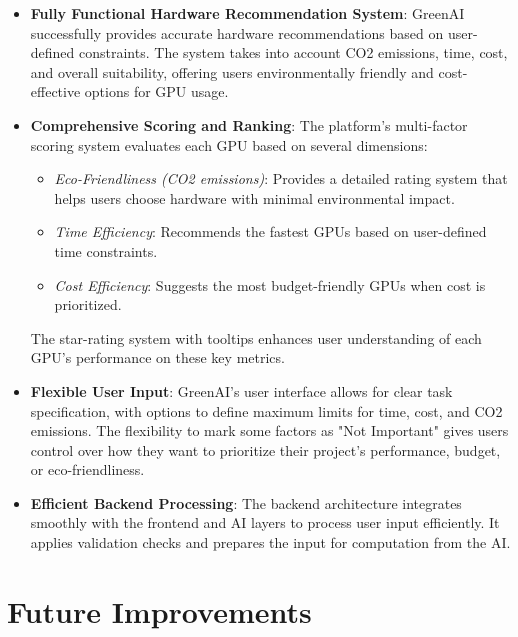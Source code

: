 \documentclass{report}
\begin{document}
\begin{itemize}
    \item \textbf{Fully Functional Hardware Recommendation System}: GreenAI successfully provides accurate hardware recommendations based on user-defined constraints. The system takes into account CO2 emissions, time, cost, and overall suitability, offering users environmentally friendly and cost-effective options for GPU usage.
    
    \item \textbf{Comprehensive Scoring and Ranking}: The platform’s multi-factor scoring system evaluates each GPU based on several dimensions:
    \begin{itemize}
        \item \textit{Eco-Friendliness (CO2 emissions)}: Provides a detailed rating system that helps users choose hardware with minimal environmental impact.
        \item \textit{Time Efficiency}: Recommends the fastest GPUs based on user-defined time constraints.
        \item \textit{Cost Efficiency}: Suggests the most budget-friendly GPUs when cost is prioritized.
    \end{itemize}
    The star-rating system with tooltips enhances user understanding of each GPU’s performance on these key metrics.

    \item \textbf{Flexible User Input}: GreenAI’s user interface allows for clear task specification, with options to define maximum limits for time, cost, and CO2 emissions. The flexibility to mark some factors as "Not Important" gives users control over how they want to prioritize their project’s performance, budget, or eco-friendliness.

    \item \textbf{Efficient Backend Processing}: The backend architecture integrates smoothly with the frontend and AI layers to process user input efficiently. It applies validation checks and prepares the input for computation from the AI.
\end{itemize}

\section{Future Improvements}
\end{document}
